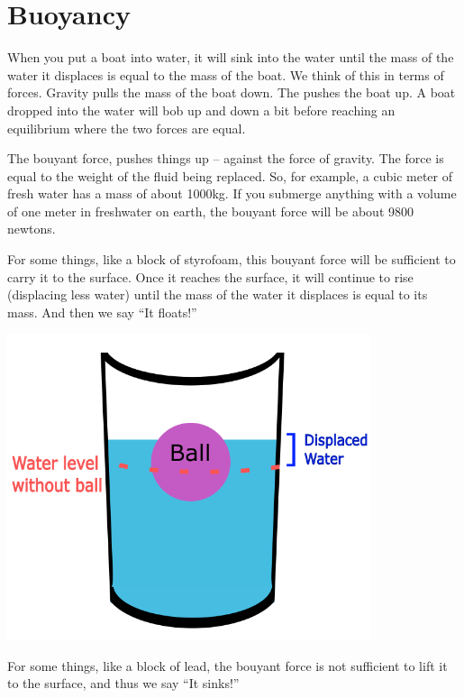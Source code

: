 \chapter{Buoyancy}

When you put a boat into water, it will sink into the water until
the mass of the water it displaces is equal to the mass of the
boat. We think of this in terms of forces. Gravity pulls the mass of
the boat down. The  pushes the boat up. A boat
dropped into the water will bob up and down a bit before reaching an
equilibrium where the two forces are equal.

The bouyant force, pushes things up -- against the force of
gravity. The force is equal to the weight of the fluid being
replaced. So, for example, a cubic meter of fresh water has a mass of
about 1000kg.  If you submerge anything with a volume of one meter in
freshwater on earth, the bouyant force will be about 9800 newtons.

For some things, like a block of styrofoam, this bouyant force will be
sufficient to carry it to the surface. Once it reaches the surface, it
will continue to rise (displacing less water) until the mass of the
water it displaces is equal to its mass. And then we say ``It floats!''

\includegraphics[width=0.8\textwidth]{Buoyancy_Displacement_Diagram.png}

For some things, like a block of lead, the bouyant force is not
 sufficient to lift it to the surface, and thus we say ``It sinks!''

